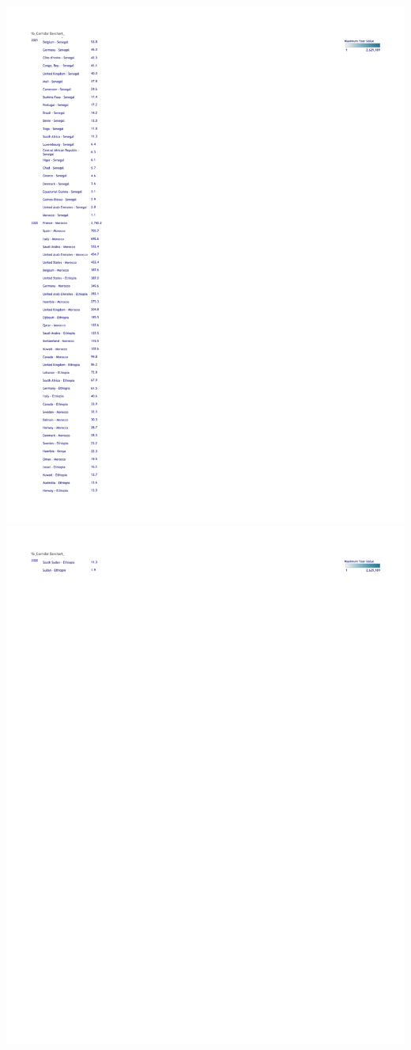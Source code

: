 \documentclass[
  11pt,
]{article}
\begin{document}
\includegraphics{data/Remittance_3/remitscope_africa_page_31.png}
\includegraphics{data/Remittance_3/remitscope_africa_page_32.png}
\end{document}
